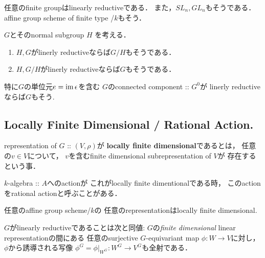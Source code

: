 \documentclass[a4paper]{jsarticle}
\newcommand{\func}[1]{\underline{#1}}
\begin{document}
    \begin{Example}
        任意のfinite groupはlinearly reductiveである．
        また，$SL_n, GL_n$もそうである．
        affine group scheme of finite type /$k$もそう．
    \end{Example}

    \begin{Prop}
        $G$とそのnormal subgroup $H$
        を考える．
        \begin{enumerate}[label=(\roman*)]
            \item $H, G$がlinerly reductiveならば$G/H$もそうである．
            \item $H, G/H$がlinerly reductiveならば$G$もそうである．
        \end{enumerate}
        特に$G$の単位元$e=\operatorname{im} \epsilon$を含む
        $G$のconnected component :: $G^0$が
        linerly reductiveならば$G$もそう.
    \end{Prop}

    \subsection{Locally Finite Dimensional / Rational Action.}
    \begin{Def}
        representation of $G$ :: $(V, \rho)$が
        \textbf{locally finite dimensional}であるとは，
        任意の$v \in V$について，
        $v$を含むfinite dimensional subrepresentation of $V$が
        存在するという事．
    \end{Def}

    \begin{Remark}
        $k$-algebra :: $A$へのactionが
        これがlocally finite dimentionalである時，
        このactionをrational actionと呼ぶことがある．
    \end{Remark}

    \begin{Prop}
        任意のaffine group scheme/$k$の
        任意のrepresentationはlocally finite dimensional.
    \end{Prop}

    \begin{Lemma}
        $G$がlinearly reductiveであることは次と同値:
        $G$の\textit{finite dimensional} linear representationの間にある
        任意のsurjective $G$-equivariant map $\phi: W \to V$に対し，
        $\phi$から誘導される写像
        $\phi^G=\phi|_{W^G}: W^G \to V^G$も全射である．
    \end{Lemma}
%        
\end{document}
